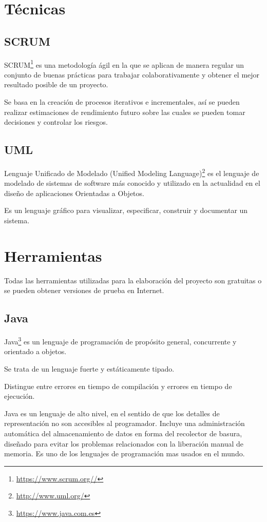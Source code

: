 
\section{Técnicas}

\subsection{SCRUM}
SCRUM\footnote{\url{https://www.scrum.org//}} es una metodología ágil en la que se aplican de manera regular un conjunto de buenas prácticas para trabajar colaborativamente y obtener el mejor resultado posible de un proyecto.

Se basa en la creación de procesos iterativos e incrementales, así se pueden realizar estimaciones de rendimiento futuro sobre las cuales se pueden tomar decisiones y controlar los riesgos.
\subsection{UML}
Lenguaje Unificado de Modelado (Unified Modeling Language)\footnote{\url{http://www.uml.org/}} es el lenguaje de modelado de sistemas de software más conocido y utilizado en la actualidad en el diseño de aplicaciones Orientadas a Objetos.

Es un lenguaje gráfico para visualizar, especificar, construir y documentar un sistema.
\section{Herramientas}

Todas las herramientas utilizadas para la elaboración del proyecto son gratuitas o se pueden obtener versiones de prueba en Internet.


\subsection{Java}
Java\footnote{\url{https://www.java.com.es}} es un lenguaje de programación de propósito general, concurrente y orientado a objetos.

Se trata de un lenguaje fuerte y estáticamente tipado.

Distingue entre errores en tiempo de compilación y errores en tiempo de ejecución.

Java es un lenguaje de alto nivel, en el sentido de que los detalles de representación no son accesibles al programador. 
Incluye una administración automática del almacenamiento de datos en forma del recolector de basura, diseñado para evitar los problemas relacionados con la liberación manual de memoria. Es uno de los lenguajes de programación mas usados en el mundo.

